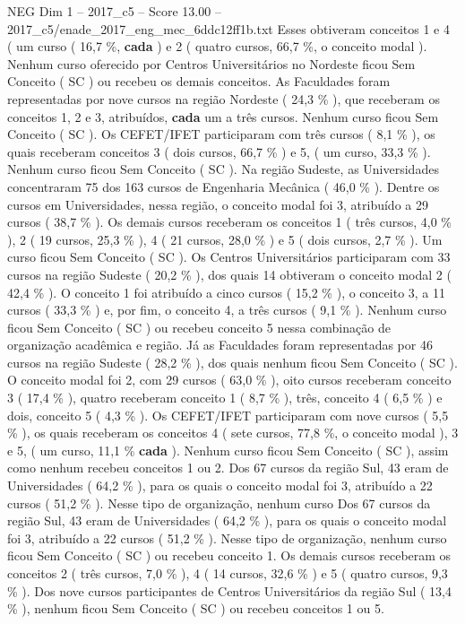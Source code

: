 \begin{textsample}{NEG Dim 1 – 2017\_c5 – Score 13.00 – 2017\_c5/enade\_2017\_eng\_mec\_6ddc12ff1b.txt}
Esses obtiveram conceitos 1 e 4 ( um curso ( 16,7 \%, \textbf{cada} ) e 2 ( quatro cursos, 66,7 \%, o conceito modal ).
Nenhum curso oferecido por Centros Universitários no Nordeste ficou Sem Conceito ( SC ) ou recebeu os demais conceitos.
As Faculdades foram representadas por nove cursos na região Nordeste ( 24,3 \% ), que receberam os conceitos 1, 2 e 3, atribuídos, \textbf{cada} um a três cursos.
Nenhum curso ficou Sem Conceito ( SC ).
Os CEFET/IFET participaram com três cursos ( 8,1 \% ), os quais receberam conceitos 3 ( dois cursos, 66,7 \% ) e 5, ( um curso, 33,3 \% ).
Nenhum curso ficou Sem Conceito ( SC ).
Na região Sudeste, as Universidades concentraram 75 dos 163 cursos de Engenharia Mecânica ( 46,0 \% ).
Dentre os cursos em Universidades, nessa região, o conceito modal foi 3, atribuído a 29 cursos ( 38,7 \% ).
Os demais cursos receberam os conceitos 1 ( três cursos, 4,0 \% ), 2 ( 19 cursos, 25,3 \% ), 4 ( 21 cursos, 28,0 \% ) e 5 ( dois cursos, 2,7 \% ).
Um curso ficou Sem Conceito ( SC ).
Os Centros Universitários participaram com 33 cursos na região Sudeste ( 20,2 \% ), dos quais 14 obtiveram o conceito modal 2 ( 42,4 \% ).
O conceito 1 foi atribuído a cinco cursos ( 15,2 \% ), o conceito 3, a 11 cursos ( 33,3 \% ) e, por fim, o conceito 4, a três cursos ( 9,1 \% ).
Nenhum curso ficou Sem Conceito ( SC ) ou recebeu conceito 5 nessa combinação de organização acadêmica e região.
Já as Faculdades foram representadas por 46 cursos na região Sudeste ( 28,2 \% ), dos quais nenhum ficou Sem Conceito ( SC ).
O conceito modal foi 2, com 29 cursos ( 63,0 \% ), oito cursos receberam conceito 3 ( 17,4 \% ), quatro receberam conceito 1 ( 8,7 \% ), três, conceito 4 ( 6,5 \% ) e dois, conceito 5 ( 4,3 \% ).
Os CEFET/IFET participaram com nove cursos ( 5,5 \% ), os quais receberam os conceitos 4 ( sete cursos, 77,8 \%, o conceito modal ), 3 e 5, ( um curso, 11,1 \% \textbf{cada} ).
Nenhum curso ficou Sem Conceito ( SC ), assim como nenhum recebeu conceitos 1 ou 2.
Dos 67 cursos da região Sul, 43 eram de Universidades ( 64,2 \% ), para os quais o conceito modal foi 3, atribuído a 22 cursos ( 51,2 \% ).
Nesse tipo de organização, nenhum curso Dos 67 cursos da região Sul, 43 eram de Universidades ( 64,2 \% ), para os quais o conceito modal foi 3, atribuído a 22 cursos ( 51,2 \% ).
Nesse tipo de organização, nenhum curso ficou Sem Conceito ( SC ) ou recebeu conceito 1.
Os demais cursos receberam os conceitos 2 ( três cursos, 7,0 \% ), 4 ( 14 cursos, 32,6 \% ) e 5 ( quatro cursos, 9,3 \% ).
Dos nove cursos participantes de Centros Universitários da região Sul ( 13,4 \% ), nenhum ficou Sem Conceito ( SC ) ou recebeu conceitos 1 ou 5.

\end{textsample}
